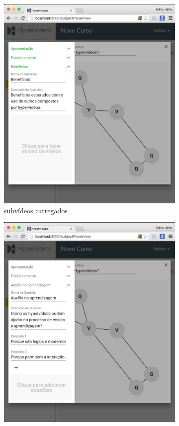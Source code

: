 \begin{figure}[h!]
  	\centering
  	\begin{subfigure}{.5\textwidth}
  		\centering
  		\includegraphics[width=.95\linewidth]{figuras/autoria_construcao_a.eps}
  		\caption{subvídeos carregados}
  		\label{fig:autoria_construcao_a}
	\end{subfigure}%
	\begin{subfigure}{.5\textwidth}
  		\centering
  		\includegraphics[width=.95\linewidth]{figuras/autoria_construcao_b.eps}

\end{subfigure}
\end{figure}
